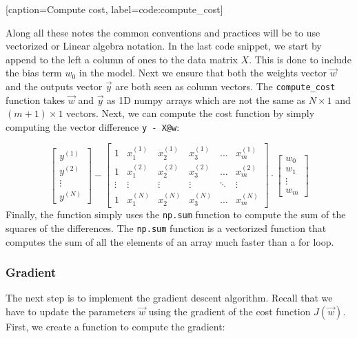[caption={Compute cost}, label={code:compute_cost}]

Along all these notes the common conventions and practices will be to use vectorized or Linear algebra notation. In the last code snippet, we start by append to the left a column of ones to the data matrix $X$. This is done to include the bias term $w_0$ in the model. Next we ensure that both the weights vector $\vec{w}$ and the outputs vector $\vec{y}$ are both seen as column vectors. The \texttt{{compute\_cost}} function takes $\vec{w}$ and $\vec{y}$ as 1D numpy arrays which are not the same as $N\times1$ and $(m+1) \times 1$ vectors. Next, we can compute the cost function by simply computing the vector difference \texttt{y - X@w}: 

\[ 
\begin{bmatrix} y^{(1)} \\ y^{(2)} \\ \vdots \\ y^{(N)}\end{bmatrix} - \begin{bmatrix}  
	1 & x_{1}^{(1)} & x_{2}^{(1)} & x_{3}^{(1)} & \dots  & x_{m}^{(1)} \\
	1 & x_{1}^{(2)} & x_{2}^{(2)} & x_{3}^{(2)} & \dots  & x_{m}^{(2)} \\
	\vdots & \vdots & \vdots & \vdots & \ddots & \vdots \\
	1 & x_{1}^{(N)} & x_{2}^{(N)} & x_{3}^{(N)} & \dots  & x_{m}^{(N)}
\end{bmatrix} \cdot \begin{bmatrix} w_0 \\ w_1 \\ \vdots \\ w_m \end{bmatrix} 
\]
Finally, the function simply uses the \texttt{np.sum} function to compute the sum of the squares of the differences. The \texttt{np.sum} function is a vectorized function that computes the sum of all the elements of an array much faster than a for loop.  

\subsubsection*{Gradient}
The next step is to implement the gradient descent algorithm. Recall that we have to update the parameters $\vec{w}$ using the gradient of the cost function $J(\vec{w})$. First, we create a function to compute the gradient:

